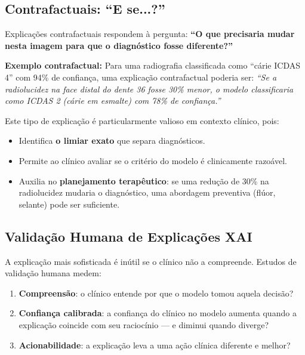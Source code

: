 \subsection{Contrafactuais: ``E se...?''}

Explicações contrafactuais respondem à pergunta: \textbf{``O que
precisaria mudar nesta imagem para que o diagnóstico fosse diferente?''}

\begin{mdframed}[linecolor=corSecundaria, linewidth=1pt, backgroundcolor=corSecundaria!5, roundcorner=4pt]
  \textbf{Exemplo contrafactual:} Para uma radiografia classificada como
  ``cárie ICDAS 4'' com 94\% de confiança, uma explicação contrafactual
  poderia ser: \textit{``Se a radiolucidez na face distal do dente 36
  fosse 30\% menor, o modelo classificaria como ICDAS 2 (cárie em
  esmalte) com 78\% de confiança.''}
\end{mdframed}

Este tipo de explicação é particularmente valioso em contexto clínico,
pois:

\begin{itemize}
  \item Identifica \textbf{o limiar exato} que separa diagnósticos.
  \item Permite ao clínico avaliar se o critério do modelo é
    clinicamente razoável.
  \item Auxilia no \textbf{planejamento terapêutico}: se uma redução de
    30\% na radiolucidez mudaria o diagnóstico, uma abordagem preventiva
    (flúor, selante) pode ser suficiente.
\end{itemize}

\subsection{Validação Humana de Explicações XAI}

A explicação mais sofisticada é inútil se o clínico não a compreende.
Estudos de validação humana medem:

\begin{enumerate}
  \item \textbf{Compreensão}: o clínico entende por que o modelo tomou
    aquela decisão?
  \item \textbf{Confiança calibrada}: a confiança do clínico no modelo
    aumenta quando a explicação coincide com seu raciocínio — e diminui
    quando diverge?
  \item \textbf{Acionabilidade}: a explicação leva a uma ação clínica
    diferente e melhor?
\end{enumerate}

